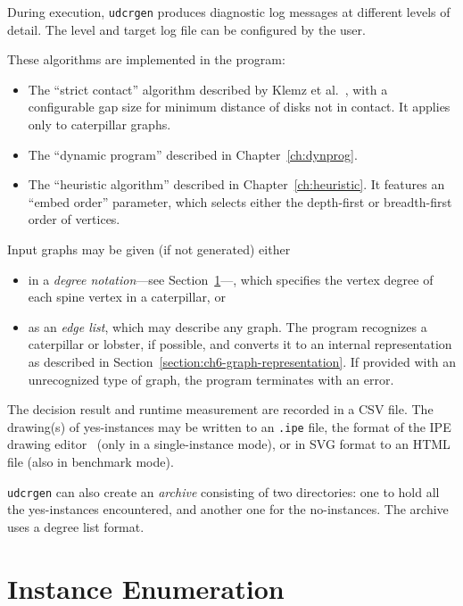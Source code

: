 During execution, \texttt{udcrgen} produces diagnostic log messages at different levels of detail. The level and target log file can be configured by the user.

These algorithms are implemented in the program:

\begin{itemize}
    \item The ``strict contact'' algorithm described by Klemz et al.~\cite{Klemz2015}, with a configurable gap size for minimum distance of disks not in contact. It applies only to caterpillar graphs.
    \item The ``dynamic program'' described in Chapter~\ref{ch:dynprog}.
    \item The ``heuristic algorithm'' described in Chapter~\ref{ch:heuristic}. It features an ``embed order'' parameter, which selects either the depth-first or breadth-first order of vertices.
\end{itemize}

Input graphs may be given (if not generated) either

\begin{itemize}
    \item in a \emph{degree notation}---see Section~\ref{section:ch6-enumeration}---, which specifies the vertex degree of each spine vertex in a caterpillar, or
    \item as an \emph{edge list}, which may describe any graph. The program recognizes a caterpillar or lobster, if possible, and converts it to an internal representation as described in Section~\ref{section:ch6-graph-representation}. If provided with an unrecognized type of graph, the program terminates with an error.
\end{itemize}

The decision result and runtime measurement are recorded in a CSV file. The drawing(s) of yes-instances may be written to an \texttt{.ipe} file, the format of the IPE drawing editor~\cite{cheong_ipe_2022} (only in a single-instance mode), or in SVG format to an HTML file (also in benchmark mode).

\texttt{udcrgen} can also create an \emph{archive} consisting of two directories: one to hold all the yes-instances encountered, and another one for the no-instances. The archive uses a degree list format.

\section{Instance Enumeration}
\label{section:ch6-enumeration}

